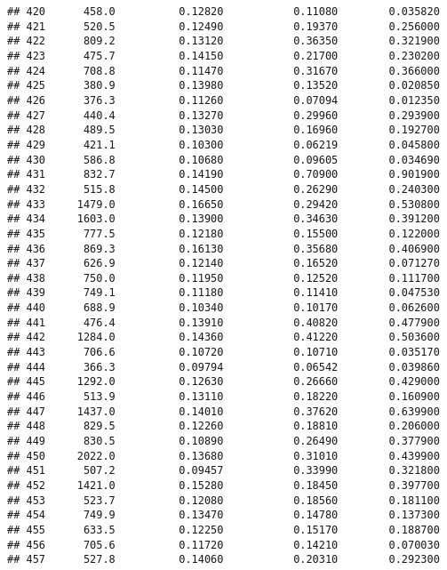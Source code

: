 \documentclass[
]{article}
\begin{document}
\begin{verbatim}
## 420      458.0          0.12820           0.11080        0.035820
## 421      520.5          0.12490           0.19370        0.256000
## 422      809.2          0.13120           0.36350        0.321900
## 423      475.7          0.14150           0.21700        0.230200
## 424      708.8          0.11470           0.31670        0.366000
## 425      380.9          0.13980           0.13520        0.020850
## 426      376.3          0.11260           0.07094        0.012350
## 427      440.4          0.13270           0.29960        0.293900
## 428      489.5          0.13030           0.16960        0.192700
## 429      421.1          0.10300           0.06219        0.045800
## 430      586.8          0.10680           0.09605        0.034690
## 431      832.7          0.14190           0.70900        0.901900
## 432      515.8          0.14500           0.26290        0.240300
## 433     1479.0          0.16650           0.29420        0.530800
## 434     1603.0          0.13900           0.34630        0.391200
## 435      777.5          0.12180           0.15500        0.122000
## 436      869.3          0.16130           0.35680        0.406900
## 437      626.9          0.12140           0.16520        0.071270
## 438      750.0          0.11950           0.12520        0.111700
## 439      749.1          0.11180           0.11410        0.047530
## 440      688.9          0.10340           0.10170        0.062600
## 441      476.4          0.13910           0.40820        0.477900
## 442     1284.0          0.14360           0.41220        0.503600
## 443      706.6          0.10720           0.10710        0.035170
## 444      366.3          0.09794           0.06542        0.039860
## 445     1292.0          0.12630           0.26660        0.429000
## 446      513.9          0.13110           0.18220        0.160900
## 447     1437.0          0.14010           0.37620        0.639900
## 448      829.5          0.12260           0.18810        0.206000
## 449      830.5          0.10890           0.26490        0.377900
## 450     2022.0          0.13680           0.31010        0.439900
## 451      507.2          0.09457           0.33990        0.321800
## 452     1421.0          0.15280           0.18450        0.397700
## 453      523.7          0.12080           0.18560        0.181100
## 454      749.9          0.13470           0.14780        0.137300
## 455      633.5          0.12250           0.15170        0.188700
## 456      705.6          0.11720           0.14210        0.070030
## 457      527.8          0.14060           0.20310        0.292300

\end{verbatim}
\end{document}

